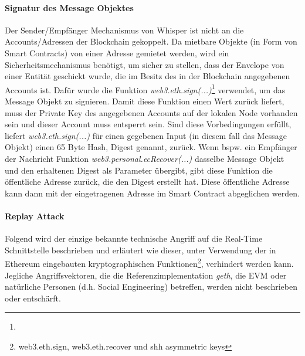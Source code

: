\paragraph{Signatur des Message Objektes}
Der Sender/Empfänger Mechanismus von Whisper ist nicht an die Accounts/Adressen der Blockchain gekoppelt. Da mietbare Objekte (in Form von Smart Contracts) von einer Adresse gemietet werden, wird ein Sicherheitsmechanismus benötigt, um sicher zu stellen, dass der Envelope von einer Entität geschickt wurde, die im Besitz des in der Blockchain angegebenen Accounts ist. Dafür wurde die Funktion \emph{web3.eth.sign(...)}\footnote{} verwendet, um das Message Objekt zu signieren. Damit diese Funktion einen Wert zurück liefert, muss der Private Key des angegebenen Accounts auf der lokalen Node vorhanden sein und dieser Account muss entsperrt sein. Sind diese Vorbedingungen erfüllt, liefert \emph{web3.eth.sign(...)} für einen gegebenen Input (in diesem fall das Message Objekt) einen 65 Byte Hash, Digest genannt, zurück. Wenn bspw. ein Empfänger der Nachricht Funktion \emph{web3.personal.ecRecover(...)} dasselbe Message Objekt und den erhaltenen Digest als Parameter übergibt, gibt diese Funktion die öffentliche Adresse zurück, die den Digest erstellt hat. Diese öffentliche Adresse kann dann mit der eingetragenen Adresse im Smart Contract abgeglichen werden.

\paragraph{Replay Attack}
\label{para:Replay_Attack}
Folgend wird der einzige bekannte technische Angriff auf die Real-Time Schnittstelle beschrieben und erläutert wie dieser, unter Verwendung der in Ethereum eingebauten kryptographischen Funktionen\footnote{web3.eth.sign, web3.eth.recover und shh asymmetric keys}, verhindert werden kann. Jegliche Angriffsvektoren, die die Referenzimplementation \emph{geth}, die \acrshort{EVM} oder natürliche Personen (d.h. Social Engineering) betreffen, werden nicht beschrieben oder entschärft.

